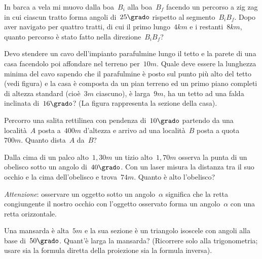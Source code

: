 \begin{esercizio}[\Ast]
\label{ese:G.46}
In barca a vela mi muovo dalla boa~$B_i$ alla boa~$B_f$ facendo un percorso a zig zag in cui ciascun tratto forma angoli di~$25\grado$
rispetto al segmento~$B_i B_f$. Dopo aver navigato per quattro tratti, di cui il primo lungo~$4\unit{km}$ e i restanti~$8\unit{km}$,
quanto percorso è stato fatto nella direzione~$B_i B_f$?
\begin{center}
 
\end{center}
\end{esercizio}
\begin{multicols}{2}
\begin{esercizio}[\Ast]
\label{ese:G.47}
Devo stendere un cavo dell'impianto parafulmine lungo il tetto e la parete di una casa facendolo poi affondare nel terreno per~$10\unit{m}$.
Quale deve essere la lunghezza minima del cavo sapendo che il parafulmine è posto sul punto più alto del tetto (vedi figura) e la casa è
composta da un pian terreno ed un primo piano completi di altezza standard (cioè~$3\unit{m}$ ciascuno), è larga~$9\unit{m}$,
ha un tetto ad una falda inclinata di~$16\grado$? (La figura rappresenta la sezione della casa).
\begin{center}
 
\end{center}
\end{esercizio}


 \begin{esercizio}[\Ast]
\label{ese:G.48}
Percorro una salita rettilinea con pendenza di~$10\grado$ partendo da una località~$A$ posta a~$400\unit{m}$ d'altezza e arrivo ad
una località~$B$ posta a quota~$700\unit{m}$. Quanto dista~$A$ da~$B$?
\end{esercizio}

\begin{esercizio}[\Ast]
\label{ese:G.49}
Dalla cima di un palco alto~$1,30\unit{m}$ un tizio alto~$1,70\unit{m}$ osserva la punta di un obelisco sotto un angolo di~$40\grado$.
Con un laser misura la distanza tra il suo occhio e la cima dell'obelisco e trova~$74\unit{m}$. Quanto è alto l'obelisco?

\emph{Attenzione}: osservare un oggetto sotto un angolo~$\alpha$ significa che la retta congiungente il nostro occhio con l'oggetto osservato
forma un angolo~$\alpha$ con una retta orizzontale.
\end{esercizio}

\begin{esercizio}[\Ast]
\label{ese:G.50}
Una mansarda è alta~$5\unit{m}$ e la sua sezione è un triangolo isoscele con angoli alla base di~$50\grado$. Quant'è larga la mansarda?
(Ricorrere solo alla trigonometria; usare sia la formula diretta della proiezione sia la formula inversa).
\end{esercizio}
\end{multicols}



